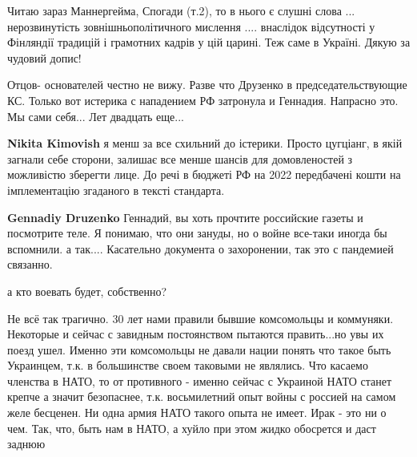  
 
 
 
 
\zzSecCmt

\begin{itemize} %

Читаю зараз Маннергейма, Спогади (т.2), то в нього є слушні слова ...
нерозвинутість зовнішньополітичного мислення .... внаслідок відсутності у
Фінляндії традицій і грамотних кадрів у цій царині. Теж саме в Україні. Дякую
за чудовий допис!


Отцов- основателей честно не вижу. Разве что Друзенко в председательствующие
КС. Только вот истерика с нападением РФ затронула и Геннадия. Напрасно это. Мы
сами себя... Лет двадцать еще...

\begin{itemize} %
\textbf{Nikita Kimovish} я менш за все схильний до істерики. Просто цугціанг, в якій загнали себе сторони, залишає все менше шансів для домовленостей з можливістю зберегти лице.
До речі в бюджеті РФ на 2022 передбачені кошти на імплементацію згаданого в тексті стандарта.

\textbf{Gennadiy Druzenko} Геннадий, вы хоть прочтите российские газеты и посмотрите теле. Я понимаю, что они зануды, но о войне все-таки иногда бы вспомнили. а так.... Касательно документа о захоронении, так это с пандемией связанно.

а кто воевать будет, собственно?
\end{itemize} %


Не всё так трагично. 30 лет нами правили бывшие комсомольцы и коммуняки.
Некоторые и сейчас с завидным постоянством пытаются править...но увы их поезд
ушел. Именно эти комсомольцы не давали нации понять что такое быть Украинцем,
т.к. в большинстве своем таковыми не являлись. Что касаемо членства в НАТО, то
от противного - именно сейчас с Украиной НАТО станет крепче а значит
безопаснее, т.к. восьмилетний опыт войны с россией на самом желе бесценен. Ни
одна армия НАТО такого опыта не имеет. Ирак - это ни о чем. Так, что, быть нам
в НАТО, а хуйло при этом жидко обосрется и даст заднюю

\end{itemize} %
